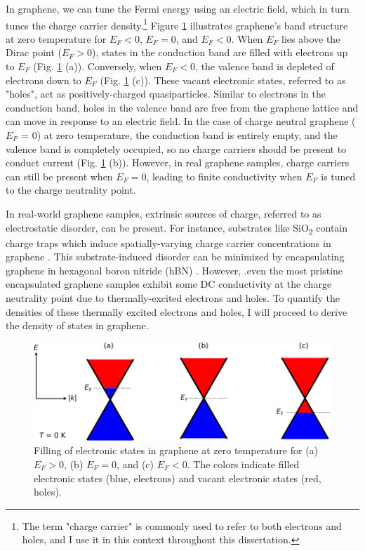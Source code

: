 \documentclass[double,12pt,1in]{beavtex}
\begin{document}
In graphene, we can tune the Fermi energy using an electric field, which in turn tunes the charge carrier density.\footnote{The term "charge carrier" is commonly used to refer to both electrons and holes, and I use it in this context throughout this dissertation.} Figure \ref{graphene bands at 0 T} illustrates graphene's band structure at zero temperature for $E_F < 0$, $E_F = 0$, and $E_F < 0$. When $E_F$ lies above the Dirac point ($E_F > 0$), states in the conduction band are filled with electrons up to $E_F$ (Fig. \ref{graphene bands at 0 T} (a)). Conversely, when $E_F < 0$, the valence band is depleted of electrons down to $E_F$ (Fig. \ref{graphene bands at 0 T} (c)). These vacant electronic states, referred to as "holes", act as positively-charged quasiparticles. Similar to electrons in the conduction band, holes in the valence band are free from the graphene lattice and can move in response to an electric field. In the case of charge neutral graphene ($E_F$ = 0) at zero temperature, the conduction band is entirely empty, and the valence band is completely occupied, so no charge carriers should be present to conduct current (Fig. \ref{graphene bands at 0 T} (b)). However, in real graphene samples, charge carriers can still be present when $E_F = 0$, leading to finite conductivity when $E_F$ is tuned to the charge neutrality point.

In real-world graphene samples, extrinsic sources of charge, referred to as electrostatic disorder, can be present. For instance, substrates like SiO\textsubscript{2} contain charge traps which induce spatially-varying charge carrier concentrations in graphene \cite{martin_observation_2008}. This substrate-induced disorder can be minimized by encapsulating graphene in hexagonal boron nitride (hBN) \cite{dean_boron_2010}. However, .even the most pristine encapsulated graphene samples exhibit some DC conductivity at the charge neutrality point \cite{xin_giant_2023} due to thermally-excited electrons and holes. To quantify the densities of these thermally excited electrons and holes, I will proceed to derive the density of states in graphene.


\begin{figure}
    \includegraphics{graphene theory 0}
    \caption{Filling of electronic states in graphene at zero temperature for (a) $E_F >0$, (b) $E_F = 0$, and (c) $E_F < 0$. The colors indicate filled electronic states (blue, electrons) and vacant electronic states (red, holes).}
    \label{graphene bands at 0 T}
\end{figure}
\end{document}
